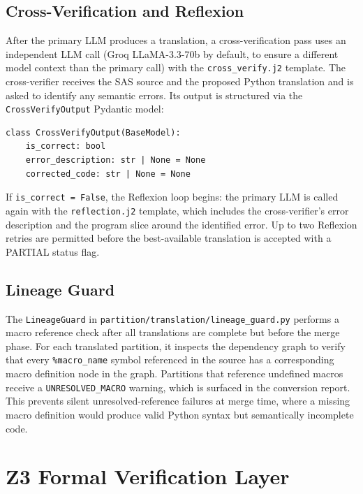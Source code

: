 \subsection{Cross-Verification and Reflexion}
\label{subsec:crossverify-impl}

After the primary LLM produces a translation, a cross-verification pass uses
an independent LLM call (Groq LLaMA-3.3-70b by default, to ensure a different
model context than the primary call) with the \texttt{cross\_verify.j2} template.
The cross-verifier receives the SAS source and the proposed Python translation
and is asked to identify any semantic errors. Its output is structured via the
\texttt{CrossVerifyOutput} Pydantic model:

\begin{verbatim}
class CrossVerifyOutput(BaseModel):
    is_correct: bool
    error_description: str | None = None
    corrected_code: str | None = None
\end{verbatim}

If \texttt{is\_correct = False}, the Reflexion loop begins: the primary LLM
is called again with the \texttt{reflection.j2} template, which includes the
cross-verifier's error description and the program slice around the identified
error. Up to two Reflexion retries are permitted before the best-available
translation is accepted with a PARTIAL status flag.

\subsection{Lineage Guard}
\label{subsec:lineage-guard-impl}

The \texttt{LineageGuard} in
\texttt{partition/translation/lineage\_guard.py} performs a macro reference
check after all translations are complete but before the merge phase. For each
translated partition, it inspects the dependency graph to verify that every
\texttt{\%macro\_name} symbol referenced in the source has a corresponding
macro definition node in the graph. Partitions that reference undefined macros
receive a \texttt{UNRESOLVED\_MACRO} warning, which is surfaced in the
conversion report. This prevents silent unresolved-reference failures at merge
time, where a missing macro definition would produce valid Python syntax but
semantically incomplete code.

\section{Z3 Formal Verification Layer}
\label{sec:z3-impl}

